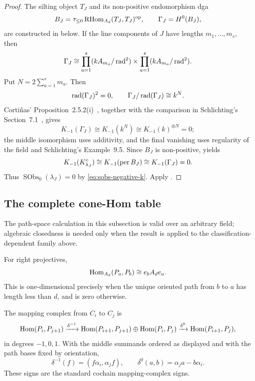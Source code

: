 \begin{proof}
The silting object \(T_J\) and its non-positive endomorphism dga
\[
 B_J=\tau_{\le0}\operatorname{RHom}_{A_d}(T_J,T_J)^{\mathrm{op}},
 \qquad
 \Gamma_J=H^0(B_J),
\]
are constructed in  below.  If the line components of \(J\) have lengths \(m_1,\ldots,m_s\), then
\[
 \Gamma_J\cong
 \prod_{a=1}^s(kA_{m_a}/\operatorname{rad}^2)
 \times
 \prod_{a=1}^s(kA_{m_a}/\operatorname{rad}^2).
\]
Put \(N=2\sum_{a=1}^s m_a\).  Then
\[
 \operatorname{rad}(\Gamma_J)^2=0,
 \qquad
 \Gamma_J/\operatorname{rad}(\Gamma_J)\cong k^N.
\]
Corti{\~n}as' Proposition~2.5.2(i)~\cite{Cortinas11}, together with the comparison in Schlichting's Section~7.1~\cite{Schlichting06}, gives
\[
 K_{-1}(\Gamma_J)
 \cong K_{-1}(k^N)
 \cong K_{-1}(k)^{\oplus N}
 =0;
\]
the middle isomorphism uses additivity, and the final vanishing uses regularity of the field and Schlichting's Example~9.5.  Since \(B_J\) is non-positive,  yields
\[
 K_{-1}(K^c_{\lambda_J})
 \cong K_{-1}(\operatorname{per} B_J)
 \cong K_{-1}(\Gamma_J)
 =0.
\]
Thus \(\operatorname{SObs}_0(\lambda_J)=0\) by \eqref{eq:sobs-negative-k}.  Apply .
\end{proof}

\subsection{The complete cone-Hom table}

The path-space calculation in this subsection is valid over an arbitrary field; algebraic closedness is needed only when the result is applied to the classification-dependent family above.

For right projectives,
\[
 \operatorname{Hom}_{A_d}(P_a,P_b)\cong e_bA_de_a.
\]
This is one-dimensional precisely when the unique oriented path from \(b\) to \(a\) has length less than \(d\), and is zero otherwise.

The mapping complex from \(C_i\) to \(C_j\) is
\begin{equation}\label{eq:nakayama-mapping-complex}
 \operatorname{Hom}(P_i,P_{j+1})
 \xrightarrow{\delta^{-1}}
 \operatorname{Hom}(P_{i+1},P_{j+1})\oplus\operatorname{Hom}(P_i,P_j)
 \xrightarrow{\delta^0}
 \operatorname{Hom}(P_{i+1},P_j),
\end{equation}
in degrees \(-1,0,1\).  With the middle summands ordered as displayed and with the path bases fixed by orientation,
\begin{equation}\label{eq:nakayama-differentials}
 \delta^{-1}(f)=(f\alpha_i,\alpha_jf),
 \qquad
 \delta^0(a,b)=\alpha_ja-b\alpha_i.
\end{equation}
These signs are the standard cochain mapping-complex signs.

